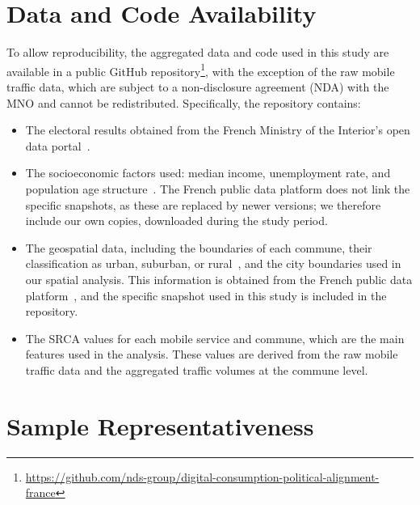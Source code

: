 \documentclass[9pt,sigconf,letterpaper]{acmart}
\begin{document}
\section{Data and Code Availability}
\label{app:data-availability}


To allow reproducibility, the aggregated data and code used in this study are available in a public GitHub repository\footnote{\href{https://github.com/nds-group/digital-consumption-political-alignment-france}{https://github.com/nds-group/digital-consumption-political-alignment-france}}, with the exception of the raw mobile traffic data, which are subject to a non-disclosure agreement (\ac{NDA}) with the \ac{MNO} and cannot be redistributed.
Specifically, the repository contains:
\begin{itemize}[noitemsep, topsep=0pt, leftmargin=10pt]
    \item The electoral results obtained from the French Ministry of the Interior's open data portal~\cite{elections2019, elections2024}.
    \item The socioeconomic factors used: median income, unemployment rate, and population age structure~\cite{soc_pop_income_educ_commune}. The French public data platform does not link the specific snapshots, as these are replaced by newer versions; we therefore include our own copies, downloaded during the study period.
    \item The geospatial data, including the boundaries of each commune, their classification as urban, suburban, or rural~\cite{commune_urban}, and the city boundaries used in our spatial analysis. This information is obtained from the French public data platform~\cite{communes_boundaries}, and the specific snapshot used in this study is included in the repository.
    \item The \ac{SRCA} values for each mobile service and commune, which are the main features used in the analysis. These values are derived from the raw mobile traffic data and the aggregated traffic volumes at the commune level.
\end{itemize}

\section{Sample Representativeness}
\label{app:representativeness}
\end{document}
